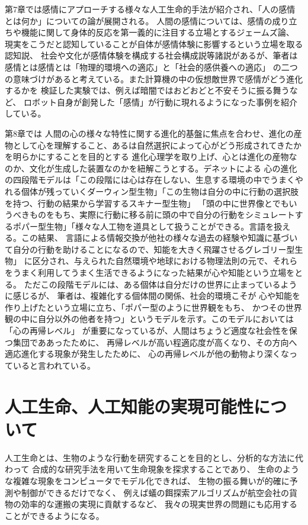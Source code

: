\documentclass[uplatex]{jsarticle}
\begin{document}
第7章では感情にアプローチする様々な人工生命的手法が紹介され、「人の感情とは何か」についての論が展開される。
人間の感情については、感情の成り立ちや機能に関して身体的反応を第一義的に注目する立場とするジェームズ論、
現実をこうだと認知していることが自体が感情体験に影響するという立場を取る認知説、
社会や文化が感情体験を構成する社会構成説等諸説があるが、筆者は感情とは感情とは「物理的環境への適応」と「社会的感供養への適応」
の二つの意味づけがあると考えている。また計算機の中の仮想敵世界で感情がどう進化するかを
検証した実験では、例えば暗闇ではおどおどと不安そうに振る舞うなど、
ロボット自身が創発した「感情」が行動に現れるようになった事例を紹介している。

第8章では
人間の心の様々な特性に関する進化的基盤に焦点を合わせ、進化の産物として心を理解すること、あるは自然選択によって心がどう形成されてきたかを明らかにすることを目的とする
進化心理学を取り上げ、心とは進化の産物なのか、文化が生成した装置なのかを紐解こうとする。デネットによる
心の進化の四段階モデルは「この段階には心は存在しない、生息する環境の中でうまくやれる個体が残っていくダーウィン型生物」「この生物は自分の中に行動の選択肢を持つ、行動の結果から学習するスキナー型生物」
「頭の中に世界像とでもいうべきものをもち、実際に行動に移る前に頭の中で自分の行動をシミュレートするポパー型生物」「様々な人工物を道具として扱うことができる。言語を扱える。この結果、
言語による情報交換が他社の様々な過去の経験や知識に基づいて自分の行動を助けることになるので、知能を大きく飛躍させるグレゴリー型生物」
に区分され、与えられた自然環境や地球における物理法則の元で、それらをうまく利用してうまく生活できるようになった結果が心や知能という立場をとる。
ただこの段階モデルには、ある個体は自分だけの世界に止まっているように感じるが、
筆者は、複雑化する個体間の関係、社会的環境こそが
心や知能を作り上げたという立場に立ち、「ポパー型のように世界観をもち、
かつその世界観の中に自分以外の他者を持つ」というモデルを示す。このモデルにおいては「心の再帰レベル」
が重要になっているが、人間はちょうど適度な社会性を保つ集団でああったために、
再帰レベルが高い程適応度が高くなり、その方向へ適応進化する現象が発生したために、
心の再帰レベルが他の動物より深くなっていると言われている。

\section{人工生命、人工知能の実現可能性について}
人工生命とは、生物のような行動を研究することを目的とし、分析的な方法に代わって
合成的な研究手法を用いて生命現象を探求することであり、
生命のような複雑な現象をコンピュータでモデル化できれば、
生物の振る舞いが的確に予測や制御ができるだけでなく、
例えば蟻の餌探索アルゴリズムが航空会社の貨物の効率的な運搬の実現に貢献するなど、
我々の現実世界の問題にも応用することができるようになる。
\end{document}
